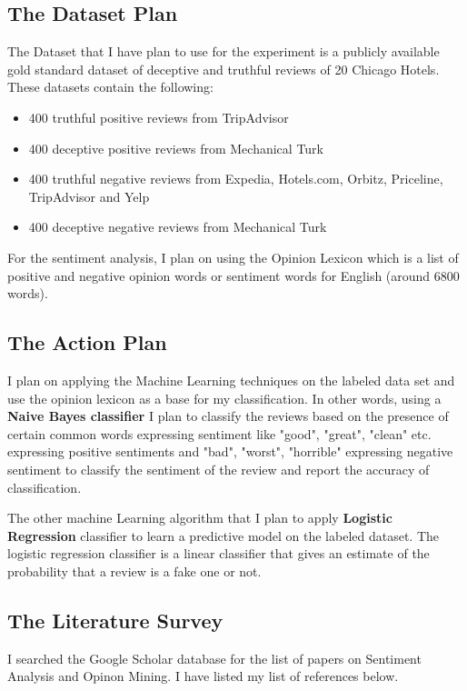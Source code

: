 \documentclass[11pt, a4paper]{article}
\begin{document}
\subsection{The Dataset Plan}
The Dataset that I have plan to use for the experiment is a publicly available gold standard dataset\cite{dataset} of deceptive and truthful reviews of 20 Chicago Hotels. These datasets contain the following:

\begin{itemize}
\item 400 truthful positive reviews from TripAdvisor 
\item 400 deceptive positive reviews from Mechanical Turk
\item 400 truthful negative reviews from Expedia, Hotels.com, Orbitz, Priceline, TripAdvisor and Yelp
\item 400 deceptive negative reviews from Mechanical Turk 
\end{itemize}

For the sentiment analysis, I plan on using the Opinion Lexicon which is a list of positive and negative opinion words or sentiment words for English (around 6800 words)\cite{op_set}. 

\subsection{The Action Plan}
I plan on applying the Machine Learning techniques on the labeled data set and use the opinion lexicon as a base for my classification. In other words, using a \textbf{Naive Bayes classifier} I plan to classify the reviews based on the presence of certain common words expressing sentiment like "good", "great", "clean" etc. expressing positive sentiments and "bad", "worst", "horrible" expressing negative sentiment to classify the sentiment of the review and report the accuracy of classification.

The other machine Learning algorithm that I plan to apply \textbf{Logistic Regression} classifier to learn a predictive model on the labeled dataset. The logistic regression classifier is a linear classifier that gives an estimate of the probability that a review is a fake one or not. 

\subsection{The Literature Survey}

I searched the Google Scholar database for the list of papers on Sentiment Analysis and Opinon Mining. I have listed my list of references below.


{}
\end{document}
